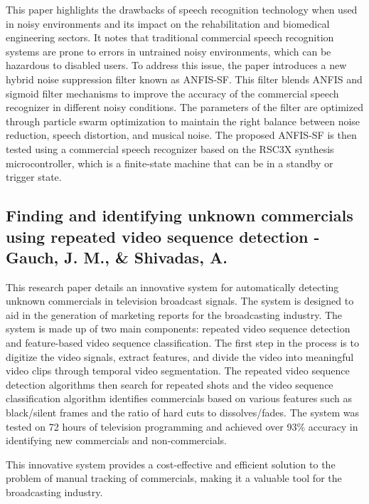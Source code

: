 \documentclass[12pt, twoside]{article}
\begin{document}
This paper highlights the drawbacks of speech recognition technology when used in noisy environments and its impact on the rehabilitation and biomedical engineering sectors. It notes that traditional commercial speech recognition systems are prone to errors in untrained noisy environments, which can be hazardous to disabled users. To address this issue, the paper introduces a new hybrid noise suppression filter known as ANFIS-SF. This filter blends ANFIS and sigmoid filter mechanisms to improve the accuracy of the commercial speech recognizer in different noisy conditions. The parameters of the filter are optimized through particle swarm optimization to maintain the right balance between noise reduction, speech distortion, and musical noise. The proposed ANFIS-SF is then tested using a commercial speech recognizer based on the RSC3X synthesis microcontroller, which is a finite-state machine that can be in a standby or trigger state.



\subsection{Finding and identifying unknown commercials using repeated video sequence detection - Gauch, J. M., \& Shivadas, A.}
This research paper details an innovative system for automatically detecting unknown commercials in television broadcast signals. The system is designed to aid in the generation of marketing reports for the broadcasting industry. The system is made up of two main components: repeated video sequence detection and feature-based video sequence classification. The first step in the process is to digitize the video signals, extract features, and divide the video into meaningful video clips through temporal video segmentation. The repeated video sequence detection algorithms then search for repeated shots and the video sequence classification algorithm identifies commercials based on various features such as black/silent frames and the ratio of hard cuts to dissolves/fades. The system was tested on 72 hours of television programming and achieved over 93\% accuracy in identifying new commercials and non-commercials. 

This innovative system provides a cost-effective and efficient solution to the problem of manual tracking of commercials, making it a valuable tool for the broadcasting industry.
\end{document}
